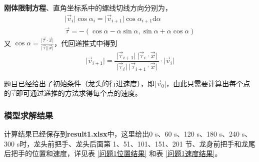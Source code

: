 \documentclass[zihao=-4, UTF8]{article}		%
\theoremstyle{MyLineTheoremStyle} %
\theoremstyle{MyBlockTheoremStyle} %
\theoremstyle{MySubsubsectionStyle} %
\begin{document}
\textbf{刚体限制方程}、直角坐标系中的螺线切线方向分别为，
\begin{gather}
    \lvert\vec{v}_{i}\rvert\cos{\alpha_{i}}=\lvert\vec{v}_{i+1}\rvert\cos{\alpha_{i+1}}\mathrm{d}\alpha \\
    \vec{\tau}=-(\cos{\alpha}-\alpha\sin{\alpha}, \sin{\alpha}+\alpha\cos{\alpha}) \label{螺线切线方向}
\end{gather}
又 $\cos{\alpha}=\frac{\lvert\vec{\tau}\cdot\vec{x}\rvert}{\lvert\vec{\tau}\rvert\lvert\vec{x}\rvert}$，代回递推式中得到
\begin{equation}
    \lvert\vec{v}_{i+1}\rvert=\frac{\ \lvert\vec{\tau}_{i+1}\rvert \ \lvert\vec{\tau}_{i}\cdot\vec{x}\rvert\ }{\ \lvert\vec{\tau}_{i}\rvert \ \lvert\vec{\tau}_{i+1}\cdot\vec{x}\rvert\ } \cdot \lvert\vec{v}_{i}\rvert
\end{equation}



题目已经给出了初始条件（龙头的行进速度），即$\lvert\vec{v}_{0}\rvert$，由此只需要计算出每个点的$\vec{\tau}$即可通过递推的方法求得每个点的速度。

\subsubsection{模型求解结果}

计算结果已经保存到\textbf{result1.xlsx}中，这里给出0 s、60 s、120 s、180 s、240 s、300 s时，龙头前把手、龙头后面第 1、51、101、151、201 节、龙身前把手和龙尾后把手的位置和速度，详见表 \ref*{问题1位置结果} 和表 \ref*{问题1速度结果}。
\end{document}
